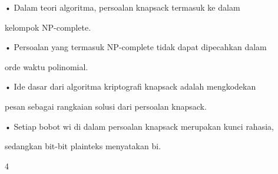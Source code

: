 \documentclass{article}
\begin{document}

• Dalam teori algoritma, persoalan knapsack termasuk ke dalam 

kelompok NP-complete. 

• Persoalan yang termasuk NP-complete tidak dapat dipecahkan dalam 

orde waktu polinomial. 

• Ide dasar dari algoritma kriptografi knapsack adalah mengkodekan 

pesan sebagai rangkaian solusi dari persoalan knapsack. 

• Setiap bobot wi di dalam persoalan knapsack merupakan kunci rahasia, 

sedangkan bit-bit plainteks menyatakan bi. 

4
\end{document}
